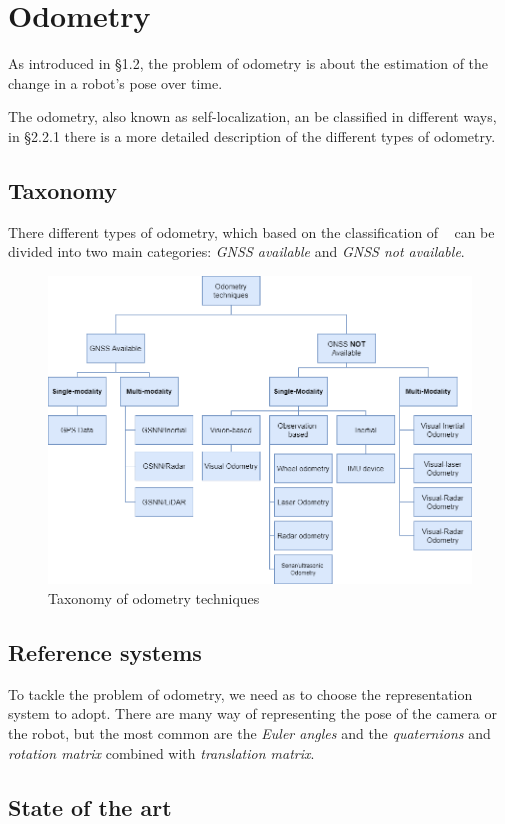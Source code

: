 \section{Odometry}\label{sec:visual-odometry}
As introduced in \S1.2, the problem of odometry is about the estimation of the change in a robot's pose over time.

The odometry, also known as self-localization, an be classified in different ways, in \S2.2.1 there is a more detailed description of the different types of odometry.

\subsection{Taxonomy}\label{subsec:tassonomy}
There different types of odometry, which based on the classification of ~\cite{vo_state_of_art} can be divided into two main categories: \textit{GNSS available} and \textit{GNSS not available}.
\begin{figure}[H]
    \centering
    \includegraphics[width=\textwidth]{images/2_2_taxonomy_odometry}
    \caption{Taxonomy of odometry techniques}\label{fig:odometry-taxonomy}
\end{figure}

\subsection{Reference systems}\label{subsec:reference-systems}
To tackle the problem of odometry, we need as to choose the representation system to adopt.
There are many way of representing the pose of the camera or the robot, but the most common are the \textit{Euler angles} and the \textit{quaternions} and \textit{rotation matrix} combined with \textit{translation matrix}.
\subsection{State of the art}\label{subsec:state-of-the-art}
